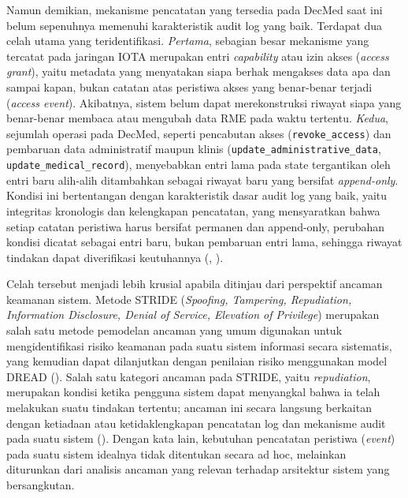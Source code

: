 Namun demikian, mekanisme pencatatan yang tersedia pada DecMed saat ini belum sepenuhnya memenuhi karakteristik audit log yang baik. Terdapat dua celah utama yang teridentifikasi. \textit{Pertama}, sebagian besar mekanisme yang tercatat pada jaringan IOTA merupakan entri \textit{capability} atau izin akses (\textit{access grant}), yaitu metadata yang menyatakan siapa berhak mengakses data apa dan sampai kapan, bukan catatan atas peristiwa akses yang benar-benar terjadi (\textit{access event}). Akibatnya, sistem belum dapat merekonstruksi riwayat siapa yang benar-benar membaca atau mengubah data RME pada waktu tertentu. \textit{Kedua}, sejumlah operasi pada DecMed, seperti pencabutan akses (\texttt{revoke\_access}) dan pembaruan data administratif maupun klinis (\texttt{update\_administrative\_data}, \texttt{update\_medical\_record}), menyebabkan entri lama pada state tergantikan oleh entri baru alih-alih ditambahkan sebagai riwayat baru yang bersifat \textit{append-only}. Kondisi ini bertentangan dengan karakteristik dasar audit log yang baik, yaitu integritas kronologis dan kelengkapan pencatatan, yang mensyaratkan bahwa setiap catatan peristiwa harus bersifat permanen dan append-only, perubahan kondisi dicatat sebagai entri baru, bukan pembaruan entri lama, sehingga riwayat tindakan dapat diverifikasi keutuhannya (\cite{iso27789_2021}, \cite{nist80053r5}).

Celah tersebut menjadi lebih krusial apabila ditinjau dari perspektif ancaman keamanan sistem. Metode STRIDE (\textit{Spoofing, Tampering, Repudiation, Information Disclosure, Denial of Service, Elevation of Privilege}) merupakan salah satu metode pemodelan ancaman yang umum digunakan untuk mengidentifikasi risiko keamanan pada suatu sistem informasi secara sistematis, yang kemudian dapat dilanjutkan dengan penilaian risiko menggunakan model DREAD (\cite{laksono2021stride}). Salah satu kategori ancaman pada STRIDE, yaitu \textit{repudiation}, merupakan kondisi ketika pengguna sistem dapat menyangkal bahwa ia telah melakukan suatu tindakan tertentu; ancaman ini secara langsung berkaitan dengan ketiadaan atau ketidaklengkapan pencatatan log dan mekanisme audit pada suatu sistem (\cite{laksono2021stride}). Dengan kata lain, kebutuhan pencatatan peristiwa (\textit{event}) pada suatu sistem idealnya tidak ditentukan secara ad hoc, melainkan diturunkan dari analisis ancaman yang relevan terhadap arsitektur sistem yang bersangkutan.

